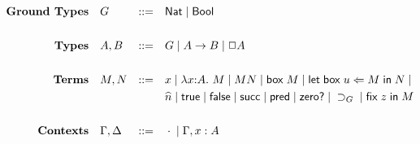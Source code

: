 \begin{align*}
  \textbf{Ground Types} \quad &
    G & ::=\quad &\textsf{Nat} \;|\; \textsf{Bool}
   \\ \\
  \textbf{Types} \quad &
    A, B & ::=\quad &G \;|\; A \rightarrow B \;|\; \Box A
   \\ \\
  \textbf{Terms} \quad &
    M, N & ::=\quad &x
      \;|\; \lambda x{:}A.\ M
      \;|\; M N
      \;|\; \mathsf{box\;}M
      \;|\; \mathsf{let\;box\;} u \Leftarrow M \mathsf{\;in\;} N \;| \\
   &      &    &\widehat{n}
      \;|\; \textsf{true}
      \;|\; \textsf{false}
      \;|\; \textsf{succ}
      \;|\; \textsf{pred}
      \;|\; \textsf{zero?}
      \;|\; \supset_G
      \;|\; \mathsf{fix\;} z \mathsf{\;in\;} M
    \\ \\
  \textbf{Contexts} \quad &
    \Gamma, \Delta & ::=\quad &\cdot \;|\; \Gamma, x: A
\end{align*}

\vfill

\renewcommand{\arraystretch}{3}

